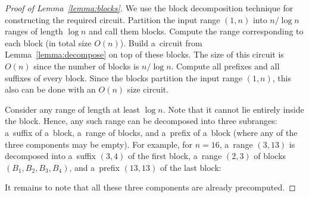 \documentclass[review,onefignum,onetabnum]{siamart190516}
\begin{document}
\begin{proof}[Proof of Lemma~\ref{lemma:blocks}]
We use the block decomposition technique for
constructing the required circuit.
Partition the input range $(1,n)$ into $n/\log n$ ranges
of length $\log n$ and call them blocks. Compute the range
corresponding to each block (in total size $O(n)$).
Build a~circuit from Lemma~\ref{lemma:decompose} on
top of these blocks. The size of this circuit is $O(n)$ since the
number of blocks is $n/\log n$.
Compute all prefixes and all suffixes of every block. Since
the blocks partition the input range $(1,n)$, this also can be done
with an $O(n)$ size circuit.

Consider any range of length at least $\log n$. Note that it
cannot lie entirely inside the block. Hence, any such range can be
decomposed into three subranges: a~suffix of a~block, a~range
of blocks, and a~prefix of a~block
(where any of the three components may be empty). For example, for $n=16$,
a~range $(3,13)$ is decomposed into a~suffix $(3,4)$ of the
first block,
a~range $(2,3)$ of blocks $(B_1, B_2, B_3, B_4)$, and a~prefix $(13,13)$ of
the last block:
\begin{center}
\end{center}
It remains to note that all these three components are already precomputed.
\end{proof}



\end{document}
